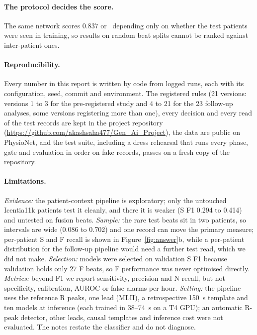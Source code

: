 \documentclass[10pt,a4paper]{article}
\begin{document}
\paragraph{The protocol decides the score.} The same network scores 0.837 or \TestCnnNoneRare\ depending only on whether the test
patients were seen in training, so results on random beat splits cannot be ranked against inter-patient ones.

\paragraph{Reproducibility.} Every number in this report is written by code from logged runs, each with its configuration, seed,
commit and environment. The registered rules (21 versions: versions 1 to 3 for the
pre-registered study and 4 to 21 for the 23 follow-up analyses, some versions registering more than one), every decision and every read of the test records are kept in
the project repository (\url{https://github.com/akashsaha477/Gen_Ai_Project}), the data are public on PhysioNet, and the test suite, including a dress rehearsal that runs every phase,
gate and evaluation in order on fake records, passes on a fresh copy of the repository.

\paragraph{Limitations.} \emph{Evidence:} the patient-context pipeline is exploratory; only the untouched Icentia11k patients test it
cleanly, and there it is weaker (S F1 0.294 to 0.414) and untested on fusion beats. \emph{Sample:} the rare test beats sit in two
patients, so intervals are wide (0.086 to 0.702) and one record can move the primary measure; per-patient S and F recall is shown in
Figure~\ref{fig:answer}b, while a per-patient distribution for the follow-up pipeline would need a further test read, which we did not
make. \emph{Selection:} models were selected on validation S F1 because validation holds only 27 F beats, so F performance was never
optimised directly. \emph{Metrics:} beyond F1 we report sensitivity, precision and N recall, but not specificity, calibration, AUROC
or false alarms per hour. \emph{Setting:} the pipeline uses the reference R peaks, one lead (MLII), a retrospective 150~s template and
ten models at inference (each trained in 38--74~s on a T4 GPU); an automatic R-peak detector, other leads, causal templates and
inference cost were not evaluated. The notes restate the classifier and do not diagnose.
\end{document}
